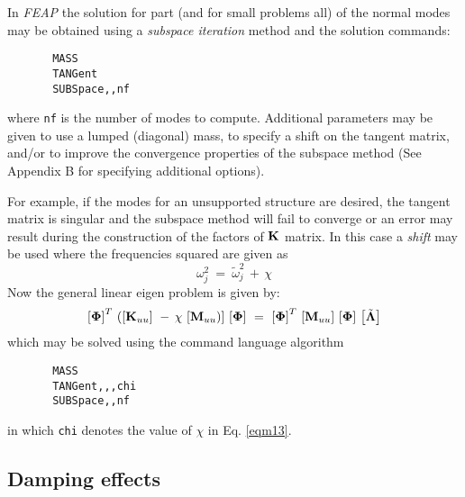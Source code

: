 In {\sl FEAP} the solution for part (and for small problems all)
of the normal modes may be obtained using
a {\it subspace iteration} method and the solution commands:
\begin{verbatim}
       MASS
       TANGent
       SUBSpace,,nf
\end{verbatim}
where {\tt nf} is the number of modes to compute.  Additional parameters
may be given to use a lumped (diagonal) mass, to specify a shift
on the tangent matrix, and/or to improve the
convergence properties of the subspace method (See Appendix B for specifying
additional options).

For example, if the modes for an unsupported structure are desired, the
tangent matrix is singular and the subspace method will fail to converge
or an error may result during the construction of the factors of $\mathbf{K}$ matrix.
In this case a {\it shift} may be used where the frequencies squared are
given as
\begin{equation}
\label{eqm13}
\omega_j^2 ~=~ \tilde{\omega}_j^2 \, + \, \chi
\end{equation}
Now the general linear eigen problem is given by:
\begin{equation}
\label{eqm14}
\left[
\boldsymbol{\Phi} \right]^T \, \left( \left[ \mathbf{K}_{uu} \right] \, \, - \, \chi
\, \left[ \mathbf{M}_{uu} \right) \right] \, \left[ \boldsymbol{\Phi}
\right] ~=~
\left[ \boldsymbol{\Phi} \right]^T \, \left[ \mathbf{M}_{uu} \right] \,
\left[ \boldsymbol{\Phi} \right] \, \left[ \tilde{\boldsymbol{\Lambda}} \right]
\end{equation}
which may be solved using the command language algorithm
\begin{verbatim}
       MASS
       TANGent,,,chi
       SUBSpace,,nf
\end{verbatim}
in which {\tt chi} denotes the value of $\chi$ in Eq. \ref{eqm13}.

\subsection{Damping effects}
\label{damping}

